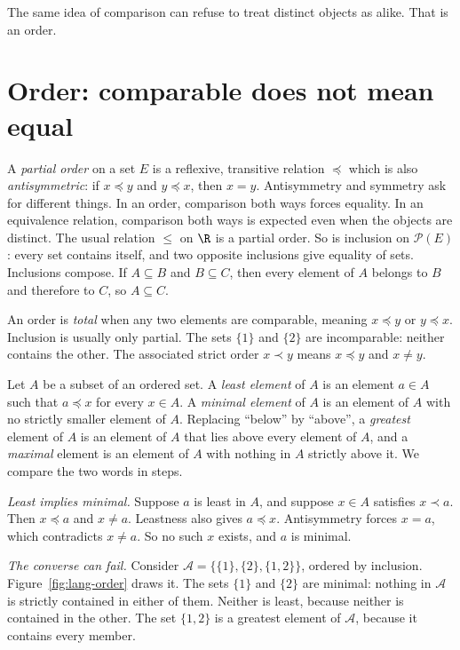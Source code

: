 The same idea of comparison can refuse to treat distinct objects as alike. That is an order.

\section{Order: comparable does not mean equal}

A \emph{partial order} on a set $E$ is a reflexive, transitive relation $\preceq$ which is also \emph{antisymmetric}: if $x\preceq y$ and $y\preceq x$, then $x=y$. Antisymmetry and symmetry ask for different things. In an order, comparison both ways forces equality. In an equivalence relation, comparison both ways is expected even when the objects are distinct. The usual relation $\le$ on $\R$ is a partial order. So is inclusion on $\mathcal P(E)$: every set contains itself, and two opposite inclusions give equality of sets. Inclusions compose. If $A\subseteq B$ and $B\subseteq C$, then every element of $A$ belongs to $B$ and therefore to $C$, so $A\subseteq C$.

An order is \emph{total} when any two elements are comparable, meaning $x\preceq y$ or $y\preceq x$. Inclusion is usually only partial. The sets $\{1\}$ and $\{2\}$ are incomparable: neither contains the other. The associated strict order $x\prec y$ means $x\preceq y$ and $x\ne y$.

Let $A$ be a subset of an ordered set. A \emph{least element} of $A$ is an element $a\in A$ such that $a\preceq x$ for every $x\in A$. A \emph{minimal element} of $A$ is an element of $A$ with no strictly smaller element of $A$. Replacing ``below'' by ``above'', a \emph{greatest} element of $A$ is an element of $A$ that lies above every element of $A$, and a \emph{maximal} element is an element of $A$ with nothing in $A$ strictly above it. We compare the two words in steps.

\emph{Least implies minimal.} Suppose $a$ is least in $A$, and suppose $x\in A$ satisfies $x\prec a$. Then $x\preceq a$ and $x\ne a$. Leastness also gives $a\preceq x$. Antisymmetry forces $x=a$, which contradicts $x\ne a$. So no such $x$ exists, and $a$ is minimal.

\emph{The converse can fail.} Consider $\mathcal A=\{\{1\},\{2\},\{1,2\}\}$, ordered by inclusion. Figure~\ref{fig:lang-order} draws it. The sets $\{1\}$ and $\{2\}$ are minimal: nothing in $\mathcal A$ is strictly contained in either of them. Neither is least, because neither is contained in the other. The set $\{1,2\}$ is a greatest element of $\mathcal A$, because it contains every member.


